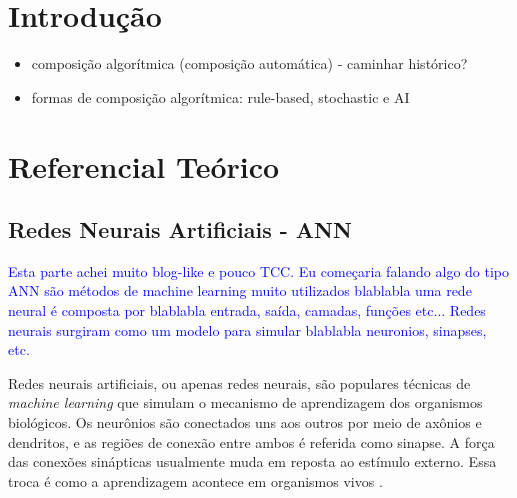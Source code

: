 \documentclass{automatextcc}
\newcommand{\pumi}[1]{\textcolor{blue}{#1}}
\begin{document}
\listoftables




\chapter{Introdução}

\begin{itemize}
    \item composição algorítmica (composição automática) - caminhar histórico?
    \item formas de composição algorítmica: rule-based, stochastic e AI
\end{itemize}





\chapter{Referencial Teórico}

\section{Redes Neurais Artificiais - ANN}

\pumi{Esta parte achei muito blog-like e pouco TCC. Eu começaria falando algo do tipo ANN são métodos de machine learning muito utilizados blablabla uma rede neural é composta por blablabla entrada, saída, camadas, funções etc... Redes neurais surgiram como um modelo para simular blablabla neuronios, sinapses, etc. }    

Redes neurais artificiais, ou apenas redes neurais, são populares técnicas de \textit{machine learning} que simulam o mecanismo de aprendizagem dos organismos biológicos. Os neurônios são conectados uns aos outros por meio de axônios e dendritos, e as regiões de conexão entre ambos é referida como sinapse. A força das conexões sinápticas usualmente muda em reposta ao estímulo externo. Essa troca é como a aprendizagem acontece em organismos vivos \citep{aggarwal2018DeepLearning}. 
\end{document}

